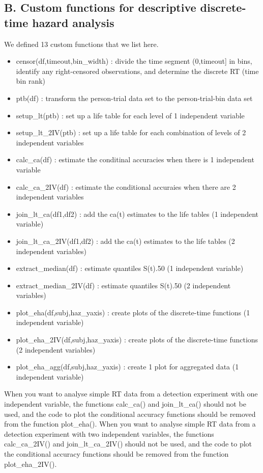 \documentclass[
  man,floatsintext]{apa6}
\providecommand{\tightlist}{%
  \setlength{\itemsep}{0pt}\setlength{\parskip}{0pt}}
\begin{document}
\subsection{B. Custom functions for descriptive discrete-time hazard analysis}\label{b.-custom-functions-for-descriptive-discrete-time-hazard-analysis}

We defined 13 custom functions that we list here.

\begin{itemize}
\tightlist
\item
  censor(df,timeout,bin\_width) : divide the time segment (0,timeout{]} in bins, identify any right-censored observations, and determine the discrete RT (time bin rank)
\item
  ptb(df) : transform the person-trial data set to the person-trial-bin data set
\item
  setup\_lt(ptb) : set up a life table for each level of 1 independent variable
\item
  setup\_lt\_2IV(ptb) : set up a life table for each combination of levels of 2 independent variables
\item
  calc\_ca(df) : estimate the conditinal accuracies when there is 1 independent variable
\item
  calc\_ca\_2IV(df) : estimate the conditional accuraies when there are 2 independent variables
\item
  join\_lt\_ca(df1,df2) : add the ca(t) estimates to the life tables (1 independent variable)
\item
  join\_lt\_ca\_2IV(df1,df2) : add the ca(t) estimates to the life tables (2 independent variables)
\item
  extract\_median(df) : estimate quantiles S(t).50 (1 independent variable)
\item
  extract\_median\_2IV(df) : estimate quantiles S(t).50 (2 independent variables)
\item
  plot\_eha(df,subj,haz\_yaxis) : create plots of the discrete-time functions (1 independent variable)
\item
  plot\_eha\_2IV(df,subj,haz\_yaxis) : create plots of the discrete-time functions (2 independent variables)
\item
  plot\_eha\_agg(df,subj,haz\_yaxis) : create 1 plot for aggregated data (1 independent variable)
\end{itemize}

When you want to analyse simple RT data from a detection experiment with one independent variable, the functions calc\_ca() and join\_lt\_ca() should not be used, and the code to plot the conditional accuracy functions should be removed from the function plot\_eha().
When you want to analyse simple RT data from a detection experiment with two independent variables, the functions calc\_ca\_2IV() and join\_lt\_ca\_2IV() should not be used, and the code to plot the conditional accuracy functions should be removed from the function plot\_eha\_2IV().
\end{document}

